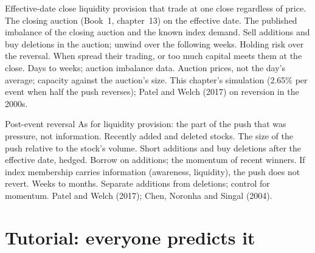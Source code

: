 \begin{strategyfile}{Effective-date close liquidity provision}\label{strat:s1:index-rebalancing:liquidity}
  that trade at one close regardless of price.
 The closing auction (Book~1, chapter~13) on the effective date.
 The published imbalance of the closing auction and the known index demand.
 Sell additions and buy deletions in the auction; unwind over the following weeks.
 Holding risk over the reversal.
 When  spread their trading, or too much capital meets them at the close.
 Days to weeks; auction imbalance data.
 Auction prices, not the day's average; capacity against the auction's size.
 This chapter's simulation (2.65\% per event when half the push reverses); Patel and Welch (2017) on reversion in the 2000s.
\end{strategyfile}

\begin{strategyfile}{Post-event reversal}\label{strat:s1:index-rebalancing:reversal}
 As for liquidity provision: the part of the push that was pressure, not information.
 Recently added and deleted stocks.
 The size of the push relative to the stock's volume.
 Short additions and buy deletions after the effective date, hedged.
 Borrow on additions; the momentum of recent winners.
 If index membership carries information (awareness, liquidity), the push does not revert.
 Weeks to months.
 Separate additions from deletions; control for momentum.
 Patel and Welch (2017); Chen, Noronha and Singal (2004).
\end{strategyfile}

\section{Tutorial: everyone predicts it}\label{tut:s1:index-rebalancing:tut}

